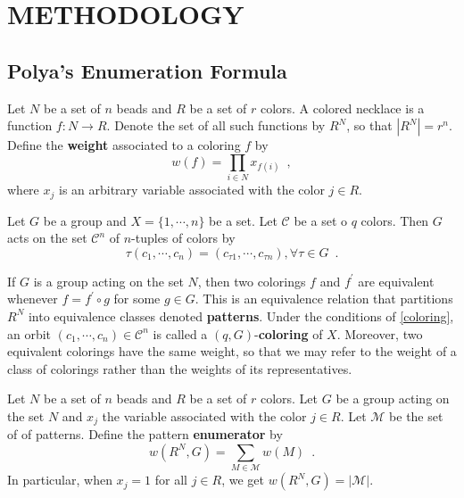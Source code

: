 \chapter{METHODOLOGY}

\section{Polya's Enumeration Formula}

\begin{definition} \cite[85]{Aigner2007} Let $N$ be a set of $n$ beads and $R$ be a set of $r$ colors. A colored necklace is a function $f : N \to R$. Denote the set of all such functions by $R^N$, so that $|R^N| = r^n$. Define the \textbf{weight} associated to a coloring $f$ by
$$
w(f) = \prod_{i \in N} x_{f(i)} \enspace,
$$
where $x_j$ is an arbitrary variable associated with the color $j \in R$.
\end{definition}

\begin{proposition} \cite[110]{Rotman1967} \label{coloring} Let $G$ be a group and $X = \{ 1, \cdots, n \}$ be a set. Let $\mathcal{C}$ be a set o $q$ colors. Then $G$ acts on the set $\mathcal{C}^n$ of $n$-tuples of colors by
$$
\tau(c_1, \cdots, c_n) = (c_{\tau 1}, \cdots, c_{\tau n}), \forall \tau \in G \enspace.
$$
\end{proposition}

\begin{proposition} \cite[85]{Aigner2007} \cite[110]{Rotman1967} If $G$ is a group acting on the set $N$, then two colorings $f$ and $f^\prime$ are equivalent whenever $f = f^\prime \circ g$ for some $g \in G$. This is an equivalence relation that partitions $R^N$ into equivalence classes denoted \textbf{patterns}. Under the conditions of \ref{coloring}, an orbit $(c_1, \cdots, c_n) \in \mathcal{C}^n$ is called a $(q, G)$-\textbf{coloring} of $X$. Moreover, two equivalent colorings have the same weight, so that we may refer to the weight of a class of colorings rather than the weights of its representatives.
\end{proposition}

\begin{definition} \cite[85]{Aigner2007} Let $N$ be a set of $n$ beads and $R$ be a set of $r$ colors. Let $G$ be a group acting on the set $N$ and $x_j$ the variable associated with the color $j \in R$. Let $\mathcal{M}$ be the set of of patterns. Define the pattern \textbf{enumerator} by
$$
w(R^N, G) = \sum_{M \in \mathcal{M}} w(M) \enspace.
$$
In particular, when $x_j = 1$ for all $j \in R$, we get $w(R^N, G) = |\mathcal{M}|$.
\end{definition}

